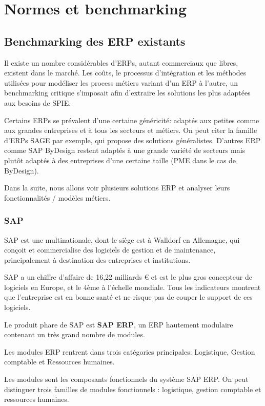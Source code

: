 \chapter{Normes et benchmarking}

    \section{Benchmarking des ERP existants}
		Il existe un nombre considérables d'ERPs, autant commerciaux que libres, existent dans le marché. Les coûts, le processus d'intégration et les méthodes utilisées pour modéliser les process métiers variant d'un ERP à l'autre, un benchmarking critique s'imposait afin d'extraire les solutions les plus adaptées aux besoins de SPIE.

    	Certains ERPs se prévalent d'une certaine généricité: adaptés aux petites comme aux grandes entreprises et à tous les secteurs et métiers. On peut citer la famille d'ERPs SAGE par exemple, qui propose des solutions généralistes. D'autres ERP comme SAP ByDesign restent adaptés à une grande variété de secteurs mais plutôt adaptés à des entreprises d'une certaine taille (PME dans le cas de ByDesign).

    	Dans la suite, nous allons voir plusieurs solutions ERP et analyser leurs fonctionnalités / modèles métiers.

	    \subsection{SAP}

	    SAP est une multinationale, dont le siège est à Walldorf en Allemagne, qui conçoit et commercialise des logiciels de gestion et de maintenance, principalement à destination des entreprises et institutions.

	    SAP a un chiffre d'affaire de 16,22 milliards € et est le plus gros concepteur de logiciels en Europe, et le 4ème à l'échelle mondiale. Tous les indicateurs montrent que l'entreprise est en bonne santé et ne risque pas de couper le support de ces logiciels.

	    Le produit phare de SAP est \textbf{SAP ERP}, un ERP hautement modulaire contenant un très grand nombre de modules.

	    Les modules ERP rentrent dans trois catégories principales: Logistique, Gestion comptable et Ressources humaines.


		Les modules sont les composants fonctionnels du système SAP ERP. On peut distinguer trois familles de modules fonctionnels : logistique, gestion comptable et ressources humaines.

